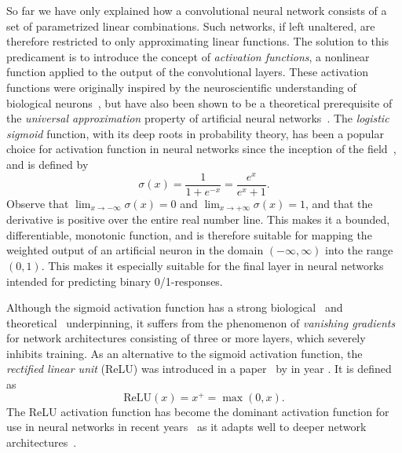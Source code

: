 So far we have only explained how a convolutional neural network consists of a set of parametrized linear combinations.
Such networks, if left unaltered, are therefore restricted to only approximating linear functions.
The solution to this predicament is to introduce the concept of \textit{activation functions}, a nonlinear function applied to the output of the convolutional layers.
These activation functions were originally inspired by the neuroscientific understanding of biological neurons~\cite[p.~165]{goodfellow}, but have also been shown to be a theoretical prerequisite of the \textit{universal approximation} property of artificial neural networks~\cite{uat-sigmoid,uat-nonpolynomial}.
The \textit{logistic sigmoid} function, with its deep roots in probability theory, has been a popular choice for activation function in neural networks since the inception of the field~\cite{rosenblatt-perceptron-1958}, and is defined by
%
\begin{equation*}
  \sigma(x) = \frac{1}{1 + e^{-x}} = \frac{e^x}{e^x + 1}.
  \tag{Sigmoid activation function}
\end{equation*}
%
Observe that $\lim_{x \to -\infty} \sigma(x) = 0$ and $\lim_{x \to +\infty} \sigma(x) = 1$, and that the derivative is positive over the entire real number line. This makes it a bounded, differentiable, monotonic function, and is therefore suitable for mapping the weighted output of an artificial neuron in the domain $(-\infty, \infty)$ into the range $(0, 1)$.
This makes it especially suitable for the final layer in neural networks intended for predicting binary 0/1-responses.

Although the sigmoid activation function has a strong biological~\cite{rosenblatt-perceptron-1958} and theoretical~\cite{uat-sigmoid} underpinning, it suffers from the phenomenon of \textit{vanishing gradients} for network architectures consisting of three or more layers, which severely inhibits training.
As an alternative to the sigmoid activation function, the \textit{rectified linear unit} (ReLU) was introduced in a paper~\cite{relu-original-paper} by \citeauthor{relu-original-paper} in year \citeyear{relu-original-paper}.
It is defined as
%
\begin{equation*}
  \mathrm{ReLU}(x) = x^+ = \max(0, x).
  \tag{ReLU activation function}
\end{equation*}
%
The ReLU activation function has become the dominant activation function for use in neural networks in recent years~\cite[p.~438]{relu-popularity} as it adapts well to deeper network architectures~\cite{relu-better-than-sigmoid}.
